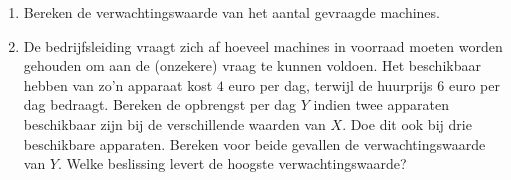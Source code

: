     \begin{enumerate}[label=(\alph*)]
        \item Bereken de verwachtingswaarde van het aantal gevraagde machines.

        \item De bedrijfsleiding vraagt zich af hoeveel machines in voorraad moeten worden gehouden om aan de (onzekere) vraag te kunnen voldoen.
        Het beschikbaar hebben van zo'n apparaat kost $4$ euro per dag, terwijl de huurprijs $6$ euro per dag bedraagt.
        Bereken de opbrengst per dag $Y$ indien twee apparaten beschikbaar zijn bij de verschillende waarden van $X$.
        Doe dit ook bij drie beschikbare apparaten. Bereken voor beide gevallen de verwachtingswaarde van $Y$.
        Welke beslissing levert de hoogste verwachtingswaarde? 
\end{enumerate}
